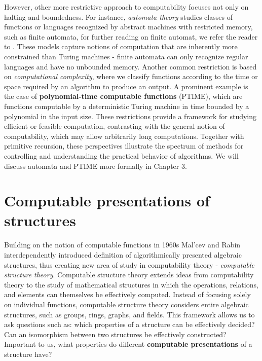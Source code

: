 \documentclass{pracalicmgr2025}
\theoremstyle{plain}            %
\theoremstyle{remark}           %
\theoremstyle{definition}       %
\begin{document}
However, other more restrictive approach to computability focuses not only on halting and boundedness. For instance, \textit{automata theory} studies classes of functions or languages recognized by abstract machines with restricted memory, such as finite automata, for further reading on finite automat, we refer the reader to \cite{hopcroft2001introduction}. These models capture notions of computation that are inherently more constrained than Turing machines - finite automata can only recognize regular languages and have no unbounded memory. Another common restriction is based on \textit{computational complexity}, where we classify functions according to the time or space required by an algorithm to produce an output. A prominent example is the case of \textbf{polynomial-time computable functions} (PTIME), which are functions computable by a deterministic Turing machine in time bounded by a polynomial in the input size. These restrictions provide a framework for studying efficient or feasible computation, contrasting with the general notion of computability, which may allow arbitrarily long computations. Together with primitive recursion, these perspectives illustrate the spectrum of methods for controlling and understanding the practical behavior of algorithms. We will discuss automata and PTIME more formally in Chapter 3.


\section{Computable presentations of structures}
Building on the notion of computable functions in 1960s Mal’cev \cite{Malcev1961} and Rabin \cite{Rabin} interdependently introduced definition of algorithmically presented algebraic structures, thus creating new area of study in computability theory - \textit{computable structure theory}. Computable structure theory extends ideas from computability theory to the study of mathematical structures in which the operations, relations, and elements can themselves be effectively computed. Instead of focusing solely on individual functions, computable structure theory considers entire algebraic structures, such as groups, rings, graphs, and fields. This framework allows us to ask questions such as: which properties of a structure can be effectively decided? Can an isomorphism between two structures be effectively constructed? Important to us, what properties do different \textbf{computable presentations} of a structure have? 
\end{document}
